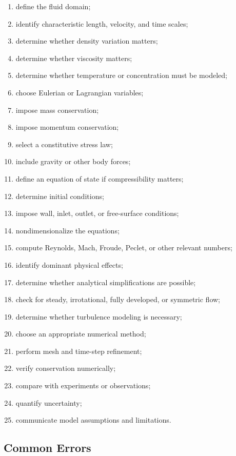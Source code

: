 \begin{enumerate}
    \item define the fluid domain;
    \item identify characteristic length, velocity, and time scales;
    \item determine whether density variation matters;
    \item determine whether viscosity matters;
    \item determine whether temperature or concentration must be modeled;
    \item choose Eulerian or Lagrangian variables;
    \item impose mass conservation;
    \item impose momentum conservation;
    \item select a constitutive stress law;
    \item include gravity or other body forces;
    \item define an equation of state if compressibility matters;
    \item determine initial conditions;
    \item impose wall, inlet, outlet, or free-surface conditions;
    \item nondimensionalize the equations;
    \item compute Reynolds, Mach, Froude, Peclet, or other relevant numbers;
    \item identify dominant physical effects;
    \item determine whether analytical simplifications are possible;
    \item check for steady, irrotational, fully developed, or symmetric flow;
    \item determine whether turbulence modeling is necessary;
    \item choose an appropriate numerical method;
    \item perform mesh and time-step refinement;
    \item verify conservation numerically;
    \item compare with experiments or observations;
    \item quantify uncertainty;
    \item communicate model assumptions and limitations.
\end{enumerate}

\subsection{Common Errors}
\label{subsec:fluid-dynamics-common-errors}

